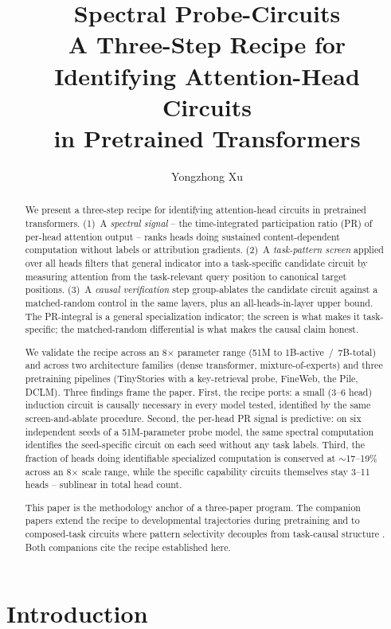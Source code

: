 \documentclass[11pt]{article}
\title{Spectral Probe-Circuits\\
\large A Three-Step Recipe for Identifying Attention-Head Circuits\\
in Pretrained Transformers}
\author{Yongzhong Xu}
\date{}
\begin{document}
\maketitle

\begin{abstract}
We present a three-step recipe for identifying attention-head circuits in pretrained transformers. (1)~A \emph{spectral signal} -- the time-integrated participation ratio (PR) of per-head attention output -- ranks heads doing sustained content-dependent computation without labels or attribution gradients. (2)~A \emph{task-pattern screen} applied over all heads filters that general indicator into a task-specific candidate circuit by measuring attention from the task-relevant query position to canonical target positions. (3)~A \emph{causal verification} step group-ablates the candidate circuit against a matched-random control in the same layers, plus an all-heads-in-layer upper bound. The PR-integral is a general specialization indicator; the screen is what makes it task-specific; the matched-random differential is what makes the causal claim honest.

We validate the recipe across an 8$\times$ parameter range (51M to 1B-active~/~7B-total) and across two architecture families (dense transformer, mixture-of-experts) and three pretraining pipelines (TinyStories with a key-retrieval probe, FineWeb, the Pile, DCLM). Three findings frame the paper. First, the recipe ports: a small (3--6 head) induction circuit is causally necessary in every model tested, identified by the same screen-and-ablate procedure. Second, the per-head PR signal is predictive: on six independent seeds of a 51M-parameter probe model, the same spectral computation identifies the seed-specific circuit on each seed without any task labels. Third, the fraction of heads doing identifiable specialized computation is conserved at $\sim$17--19\% across an 8$\times$ scale range, while the specific capability circuits themselves stay 3--11 heads -- sublinear in total head count.

This paper is the methodology anchor of a three-paper program. The companion papers extend the recipe to developmental trajectories during pretraining \citep{paper2_developmental} and to composed-task circuits where pattern selectivity decouples from task-causal structure \citep{paper3_circuits}. Both companions cite the recipe established here.
\end{abstract}

\section{Introduction}
\end{document}
